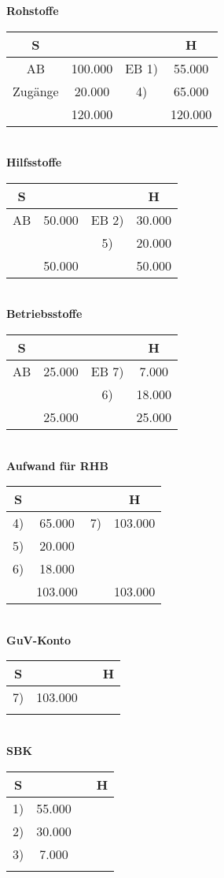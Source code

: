 \documentclass[paper=a4, fontsize=11pt]{scrartcl}
\numberwithin{equation}{section}
\numberwithin{figure}{section}
\numberwithin{table}{section}
\begin{document}
\textbf{Rohstoffe} 
\begin{tabular}{cc|cc}
S & & & H \\\hline
AB  & 100.000 & EB 1) & 55.000 \\
Zugänge  & 20.000 & 4) & 65.000 \\\hline
  & 120.000 & & 120.000 \\\hline
\end{tabular} \\
\textbf{Hilfsstoffe}
\begin{tabular}{cc|cc}
S & & & H \\\hline
AB & 50.000 & EB 2) & 30.000 \\
  & & 5) & 20.000 \\\hline
  & 50.000 & & 50.000 \\\hline
\end{tabular} \\
\textbf{Betriebsstoffe}
\begin{tabular}{cc|cc}
S & & & H \\\hline
AB & 25.000 & EB 7) & 7.000 \\
  & & 6) & 18.000 \\\hline
  & 25.000 & & 25.000 \\\hline
\end{tabular} \\
\textbf{Aufwand für RHB}
\begin{tabular}{cc|cc}
S & & & H \\\hline
4) & 65.000 & 7) & 103.000 \\
5) & 20.000 & & \\
6) & 18.000 & & \\\hline
 & 103.000 & & 103.000 \\\hline
\end{tabular} \\
\textbf{GuV-Konto}
\begin{tabular}{cc|cc}
S & & & H \\\hline
7) & 103.000 & & \\
  & & & \\
\end{tabular} \\
\textbf{SBK}
\begin{tabular}{cc|cc}
S & & & H \\\hline
1) & 55.000 & & \\
2) & 30.000 & & \\
3) & 7.000 & & \\
  & & & \\
\end{tabular} \\
\end{document}
